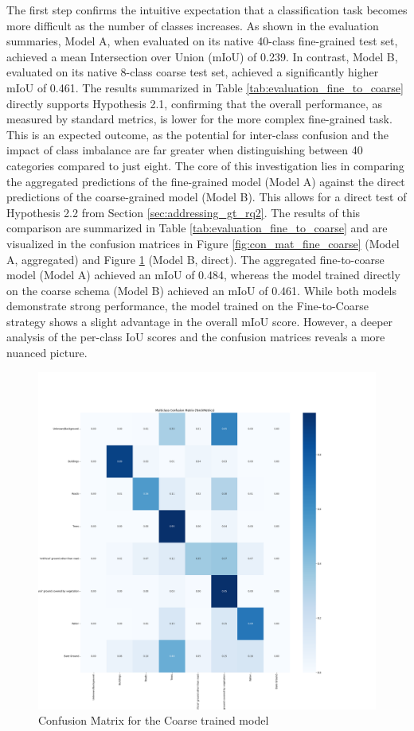 \documentclass{report}
\begin{document}
The first step confirms the intuitive expectation that a classification task becomes more difficult as the number of classes increases. As shown in the evaluation summaries, Model A, when evaluated on its native 40-class fine-grained test set, achieved a mean Intersection over Union (mIoU) of 0.239. In contrast, Model B, evaluated on its native 8-class coarse test set, achieved a significantly higher mIoU of 0.461. The results summarized in Table \ref{tab:evaluation_fine_to_coarse} directly supports Hypothesis 2.1, confirming that the overall performance, as measured by standard metrics, is lower for the more complex fine-grained task. This is an expected outcome, as the potential for inter-class confusion and the impact of class imbalance are far greater when distinguishing between 40 categories compared to just eight.
The core of this investigation lies in comparing the aggregated predictions of the fine-grained model (Model A) against the direct predictions of the coarse-grained model (Model B). This allows for a direct test of Hypothesis 2.2 from Section \ref{sec:addressing_gt_rq2}. The results of this comparison are summarized in Table \ref{tab:evaluation_fine_to_coarse} and are visualized in the confusion matrices in Figure \ref{fig:con_mat_fine_coarse} (Model A, aggregated) and Figure \ref{fig:con_mat_coarse} (Model B, direct).
The aggregated fine-to-coarse model (Model A) achieved an mIoU of 0.484, whereas the model trained directly on the coarse schema (Model B) achieved an mIoU of 0.461. While both models demonstrate strong performance, the model trained on the Fine-to-Coarse strategy shows a slight advantage in the overall mIoU score. However, a deeper analysis of the per-class IoU scores and the confusion matrices reveals a more nuanced picture.
\begin{figure}
    \centering
    \includegraphics[width=0.7\linewidth]{own_images/coarse_confusion_matrix_SegFormer_mit_b3_20250629_092703.png}
    \caption{Confusion Matrix for the Coarse trained model}
    \label{fig:con_mat_coarse}
\end{figure}
\end{document}
